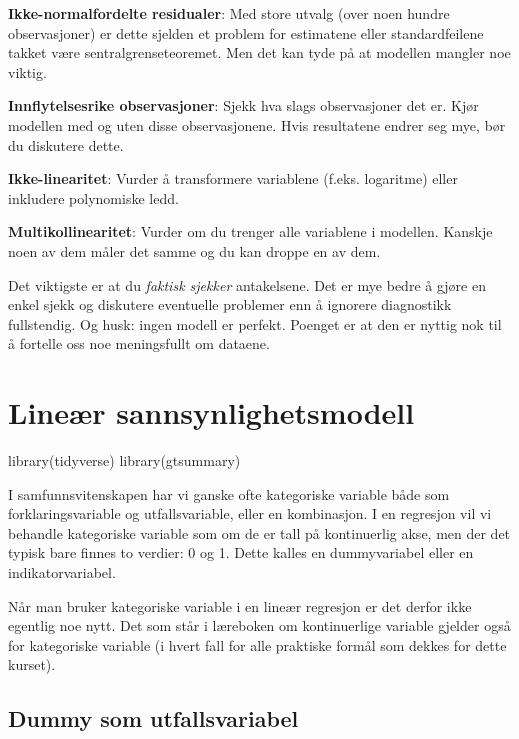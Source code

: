 \documentclass[
  norsk,
  letterpaper,
  DIV=11,
  numbers=noendperiod]{scrreprt}
\newenvironment{Shaded}{\begin{snugshade}}{\end{snugshade}}
\newcommand{\FunctionTok}[1]{\textcolor[rgb]{0.28,0.35,0.67}{#1}}
\newcommand{\NormalTok}[1]{\textcolor[rgb]{0.00,0.23,0.31}{#1}}
\theoremstyle{definition}
\theoremstyle{remark}
\begin{document}
\textbf{Ikke-normalfordelte residualer}: Med store utvalg (over noen
hundre observasjoner) er dette sjelden et problem for estimatene eller
standardfeilene takket være sentralgrenseteoremet. Men det kan tyde på
at modellen mangler noe viktig.

\textbf{Innflytelsesrike observasjoner}: Sjekk hva slags observasjoner
det er. Kjør modellen med og uten disse observasjonene. Hvis resultatene
endrer seg mye, bør du diskutere dette.

\textbf{Ikke-linearitet}: Vurder å transformere variablene (f.eks.
logaritme) eller inkludere polynomiske ledd.

\textbf{Multikollinearitet}: Vurder om du trenger alle variablene i
modellen. Kanskje noen av dem måler det samme og du kan droppe en av
dem.

Det viktigste er at du \emph{faktisk sjekker} antakelsene. Det er mye
bedre å gjøre en enkel sjekk og diskutere eventuelle problemer enn å
ignorere diagnostikk fullstendig. Og husk: ingen modell er perfekt.
Poenget er at den er nyttig nok til å fortelle oss noe meningsfullt om
dataene.

\chapter{Lineær
sannsynlighetsmodell}\label{lineuxe6r-sannsynlighetsmodell}

\begin{Shaded}
\begin{Highlighting}[]
\FunctionTok{library}\NormalTok{(tidyverse)}
\FunctionTok{library}\NormalTok{(gtsummary)}
\end{Highlighting}
\end{Shaded}

I samfunnsvitenskapen har vi ganske ofte kategoriske variable både som
forklaringsvariable og utfallsvariable, eller en kombinasjon. I en
regresjon vil vi behandle kategoriske variable som om de er tall på
kontinuerlig akse, men der det typisk bare finnes to verdier: 0 og 1.
Dette kalles en dummyvariabel eller en indikatorvariabel.

Når man bruker kategoriske variable i en lineær regresjon er det derfor
ikke egentlig noe nytt. Det som står i læreboken om kontinuerlige
variable gjelder også for kategoriske variable (i hvert fall for alle
praktiske formål som dekkes for dette kurset).

\section{Dummy som utfallsvariabel}\label{dummy-som-utfallsvariabel}
\end{document}
